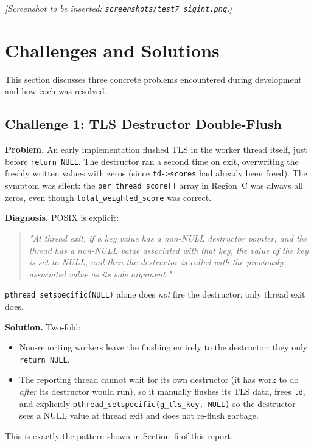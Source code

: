 \documentclass[11pt,a4paper]{article}
\newcommand{\code}[1]{\texttt{\small #1}}
\begin{document}
\noindent
\textit{[Screenshot to be inserted: \code{screenshots/test7\_sigint.png}.]}

\section{Challenges and Solutions}

This section discusses three concrete problems encountered during
development and how each was resolved.

\subsection{Challenge 1: TLS Destructor Double-Flush}

\textbf{Problem.} An early implementation flushed TLS in the worker
thread itself, just before \code{return NULL}. The destructor ran a
second time on exit, overwriting the freshly written values with zeros
(since \code{td->scores} had already been freed). The symptom was
silent: the \code{per\_thread\_score[]} array in Region~C was always
all zeros, even though \code{total\_weighted\_score} was correct.

\textbf{Diagnosis.} POSIX is explicit:
\begin{quote}\itshape
"At thread exit, if a key value has a non-NULL destructor pointer, and
the thread has a non-NULL value associated with that key, the value of
the key is set to NULL, and then the destructor is called with the
previously associated value as its sole argument."
\end{quote}
\code{pthread\_setspecific(NULL)} alone does \emph{not} fire the
destructor; only thread exit does.

\textbf{Solution.} Two-fold:
\begin{itemize}
    \item Non-reporting workers leave the flushing entirely to the
        destructor: they only \code{return NULL}.
    \item The reporting thread cannot wait for its own destructor (it
        has work to do \emph{after} its destructor would run), so it
        manually flushes its TLS data, frees \code{td}, and explicitly
        \code{pthread\_setspecific(g\_tls\_key, NULL)} so the
        destructor sees a NULL value at thread exit and does not
        re-flush garbage.
\end{itemize}
This is exactly the pattern shown in Section~6 of this report.
\end{document}
